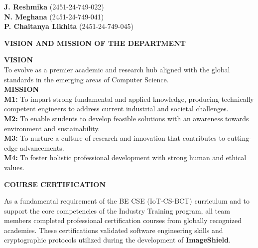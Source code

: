 \documentclass[12pt,a4paper]{report}
\begin{document}
\noindent
\hfill
\begin{minipage}[t]{0.5\textwidth}
    \flushleft
    \textbf{J. Reshmika} (2451-24-749-022)\\[0.2cm]
    \textbf{N. Meghana} (2451-24-749-041)\\[0.2cm]
    \textbf{P. Chaitanya Likhita} (2451-24-749-045)
\end{minipage}

\newpage
\begin{center}
    {\fontsize{14}{16}\selectfont \textbf{VISION AND MISSION OF THE DEPARTMENT}}\\[1.0cm]
\end{center}

\noindent \textbf{VISION}\\[0.3cm]
To evolve as a premier academic and research hub aligned with the global standards in the emerging areas of Computer Science.\\[1.0cm]

\noindent \textbf{MISSION}\\[0.3cm]
\noindent \textbf{M1:} To impart strong fundamental and applied knowledge, producing technically competent engineers to address current industrial and societal challenges.\\[0.3cm]
\noindent \textbf{M2:} To enable students to develop feasible solutions with an awareness towards environment and sustainability.\\[0.3cm]
\noindent \textbf{M3:} To nurture a culture of research and innovation that contributes to cutting-edge advancements.\\[0.3cm]
\noindent \textbf{M4:} To foster holistic professional development with strong human and ethical values.

\newpage
\begin{center}
    {\fontsize{14}{16}\selectfont \textbf{COURSE CERTIFICATION}}\\[1.0cm]
\end{center}

\noindent As a fundamental requirement of the BE CSE (IoT-CS-BCT) curriculum and to support the core competencies of the Industry Training program, all team members completed professional certification courses from globally recognized academies. These certifications validated software engineering skills and cryptographic protocols utilized during the development of \textbf{ImageShield}.\\[0.6cm]
\end{document}
